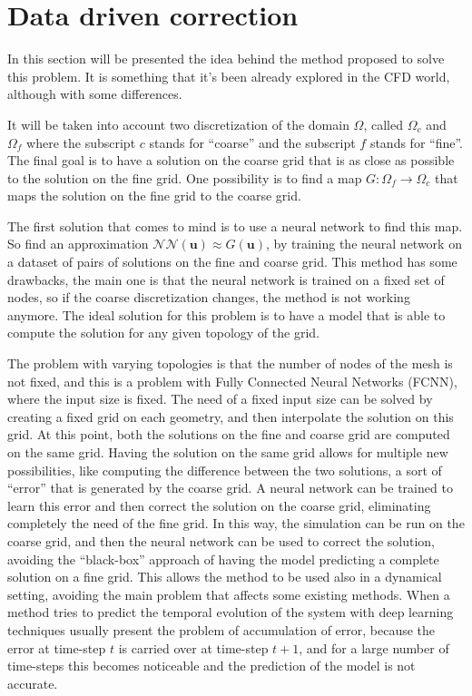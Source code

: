 \section{Data driven correction}
\label{sec:dd_correction}

In this section will be presented the idea behind the method proposed to solve this problem. It is something that it's been already explored in the CFD world, although with some differences. 

It will be taken into account two discretization of the domain \(\Omega\), called \(\Omega_c\) and \(\Omega_f\) where the subscript \(c\) stands for ``coarse'' and the subscript \(f\) stands for ``fine''. The final goal is to have a solution on the coarse grid that is as close as possible to the solution on the fine grid. One possibility is to find a map \(G: \Omega_f \rightarrow \Omega_c\) that maps the solution on the fine grid to the coarse grid. 

The first solution that comes to mind is to use a neural network to find this map. So find an approximation \(\mathcal{NN}(\bm{u}) \approx G(\bm{u})\), by training the neural network on a dataset of pairs of solutions on the fine and coarse grid. This method has some drawbacks, the main one is that the neural network is trained on a fixed set of nodes, so if the coarse discretization changes, the method is not working anymore. The ideal solution for this problem is to have a model that is able to compute the solution for any given topology of the grid.

The problem with varying topologies is that the number of nodes of the mesh is not fixed, and this is a problem with Fully Connected Neural Networks (FCNN), where the input size is fixed. The need of a fixed input size can be solved by creating a fixed grid on each geometry, and then interpolate the solution on this grid. At this point, both the solutions on the fine and coarse grid are computed on the same grid. Having the solution on the same grid allows for multiple new possibilities, like computing the difference between the two solutions, a sort of ``error'' that is generated by the coarse grid. A neural network can be trained to learn this error and then correct the solution on the coarse grid, eliminating completely the need of the fine grid. In this way, the simulation can be run on the coarse grid, and then the neural network can be used to correct the solution, avoiding the ``black-box'' approach of having the model predicting a complete solution on a fine grid. This allows the method to be used also in a dynamical setting, avoiding the main problem that affects some existing methods. When a method tries to predict the temporal evolution of the system with deep learning techniques usually present the problem of accumulation of error, because the error at time-step \(t\) is carried over at time-step \(t+1\), and for a large number of time-steps this becomes noticeable and the prediction of the model is not accurate. 

